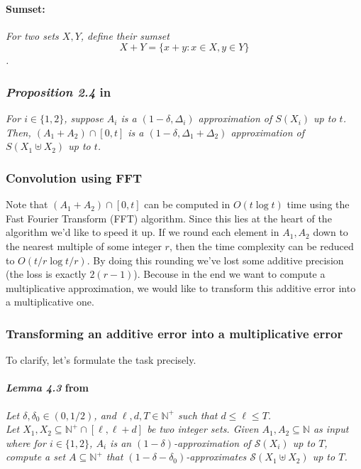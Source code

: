 \paragraph{Sumset:}
\textit{For two sets \( X, Y \), define their sumset \[ X + Y = \{x + y : x \in X, y \in Y\} \].}


\subsubsection{\textit{Proposition 2.4} in \cite{deng}} 

\textit{For \(i \in \{1, 2\}\), suppose \(A_i\) is a \((1 - \delta, \Delta_i)\) approximation of \(S(X_i)\) up to \(t\). Then, \((A_1 + A_2) \cap [0, t]\) is a \((1 - \delta, \Delta_1 + \Delta_2)\) approximation of \(S(X_1 \uplus X_2)\) up to \(t\).} \\

\subsubsection{Convolution using FFT}

Note that \((A_1 + A_2) \cap [0, t]\) can be computed in \(O(t \log t)\) time using the Fast Fourier Transform (FFT) algorithm. Since this lies at the heart of the algorithm we'd like to speed it up. If we round each element in \(A_1, A_2\) down to the nearest multiple of some integer $r$, then the time complexity can be reduced to \(O(t / r \log t / r)\). 
By doing this rounding we've lost some additive precision (the loss is exactly $2(r-1)$).  Becouse in the end we want to compute a multiplicative approximation, we would like to transform this additive error into a multiplicative one. 

\subsubsection{Transforming an additive error into a multiplicative error}
To clarify, let's formulate the task precisely.
\paragraph{\textit{Lemma 4.3} from \cite{deng}} \textit{Let \(\delta, \delta_0 \in (0, 1/2)\), and \(\ell, d, T \in \mathbb{N}^+\) such that \(d \leq \ell \leq T\).}\\
\textit{Let \(X_1, X_2 \subseteq \mathbb{N}^+ \cap [\ell, \ell + d]\) be two integer sets. Given \(A_1, A_2 \subseteq \mathbb{N}\) as input where for \(i \in \{1, 2\}\), \(A_i\) is an \((1 - \delta)\)-approximation of \(\mathcal{S}(X_i)\) up to \(T\), compute a set \(A \subseteq \mathbb{N}^+\) that \((1 - \delta - \delta_0)\)-approximates \(\mathcal{S}(X_1 \uplus X_2)\) up to \(T\).} \\

